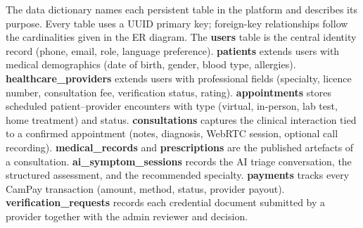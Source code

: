 The data dictionary names each persistent table in the platform and describes its purpose. Every table uses a UUID primary key; foreign-key relationships follow the cardinalities given in the ER diagram. The \textbf{users} table is the central identity record (phone, email, role, language preference). \textbf{patients} extends users with medical demographics (date of birth, gender, blood type, allergies). \textbf{healthcare\_providers} extends users with professional fields (specialty, licence number, consultation fee, verification status, rating). \textbf{appointments} stores scheduled patient--provider encounters with type (virtual, in-person, lab test, home treatment) and status. \textbf{consultations} captures the clinical interaction tied to a confirmed appointment (notes, diagnosis, WebRTC session, optional call recording). \textbf{medical\_records} and \textbf{prescriptions} are the published artefacts of a consultation. \textbf{ai\_symptom\_sessions} records the AI triage conversation, the structured assessment, and the recommended specialty. \textbf{payments} tracks every CamPay transaction (amount, method, status, provider payout). \textbf{verification\_requests} records each credential document submitted by a provider together with the admin reviewer and decision.
